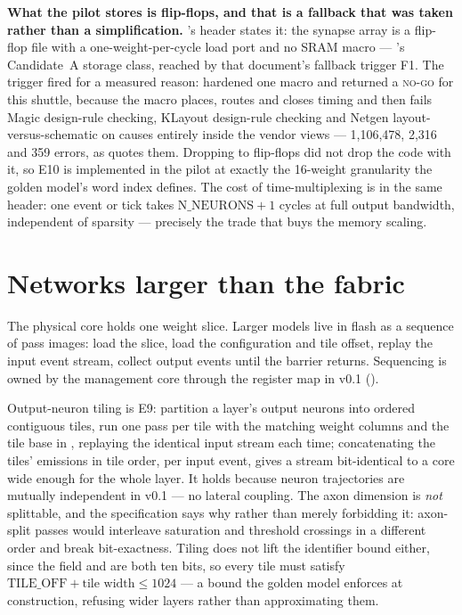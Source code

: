 \textbf{What the pilot stores is flip-flops, and that is a fallback
that was taken rather than a simplification.}
's header states it: the synapse array is a
flip-flop file with a one-weight-per-cycle load port and no SRAM macro
--- 's Candidate~A storage class, reached by that
document's fallback trigger F1. The trigger fired for a measured
reason:  hardened one 
macro and returned a \textsc{no-go} for this shuttle, because the macro
places, routes and closes timing and then fails Magic design-rule
checking, KLayout design-rule checking and Netgen
layout-versus-schematic on causes entirely inside the vendor views ---
1,106,478, 2,316 and 359 errors, as  quotes them.
Dropping to flip-flops did not drop the code with it, so E10 is
implemented in the pilot at exactly the 16-weight granularity the
golden model's word index defines. The cost of time-multiplexing is in
the same header: one event or tick takes $\mathrm{N\_NEURONS}+1$ cycles
at full output bandwidth, independent of sparsity --- precisely the
trade that buys the memory scaling.

\section{Networks larger than the fabric}

The physical core holds one weight slice. Larger models live in flash
as a sequence of pass images: load the slice, load the configuration
and tile offset, replay the input event stream, collect output events
until the barrier returns. Sequencing is owned by the management core
through the register map in v0.1 ().

Output-neuron tiling is E9: partition a layer's output neurons into
ordered contiguous tiles, run one pass per tile with the matching
weight columns and the tile base in , replaying
the identical input stream each time; concatenating the tiles'
emissions in tile order, per input event, gives a stream bit-identical
to a core wide enough for the whole layer. It holds because neuron
trajectories are mutually independent in v0.1 --- no lateral coupling.
The axon dimension is \emph{not} splittable, and the specification says
why rather than merely forbidding it: axon-split passes would
interleave saturation and threshold crossings in a different order and
break bit-exactness. Tiling does not lift the identifier bound either,
since the  field and  are both ten bits,
so every tile must satisfy
$\mathrm{TILE\_OFF} + \text{tile width} \leq 1024$ --- a bound the
golden model enforces at construction, refusing wider layers rather
than approximating them.

